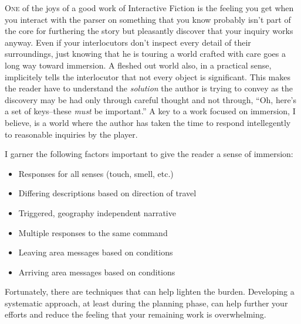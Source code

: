 \lettrine[lines=3]{\color{BrickRed}O}{\enspace ne} of the joys of a good work of Interactive Fiction is the feeling
you get when you interact with the parser on something that you know probably
isn't part of the core for furthering the story but pleasantly discover that
your inquiry works anyway. Even if your interlocutors don't inspect every detail
of their surroundings, just knowing that he is touring a world crafted with care
goes a long way toward immersion.
A fleshed out world also, in a practical
sense, implicitely tells the interlocutor that not every object is significant.
This makes the reader have to understand the \textit{solution} the author is
trying to convey as the discovery may be had only through careful thought and
not through, ``Oh, here's a set of keys--these \textit{must} be important.'' A key to a work focused on immersion, I believe, is a world where the author has taken the time to respond intellegently to reasonable inquiries by the player. 

I garner the following factors important to give the reader a sense of immersion:

\begin{itemize}
  \item{Responses for all senses (touch, smell, etc.)}
\item{Differing descriptions based on direction of travel}
\item{Triggered, geography independent narrative}
\item{Multiple responses to the same command}
  \item{Leaving area messages based on conditions}
  \item{Arriving area messages based on conditions}
  \end{itemize}


Fortunately, there are techniques that can help lighten the burden. Developing a systematic approach, at least during the planning phase, can help further your efforts and reduce the feeling that your remaining work is overwhelming.

